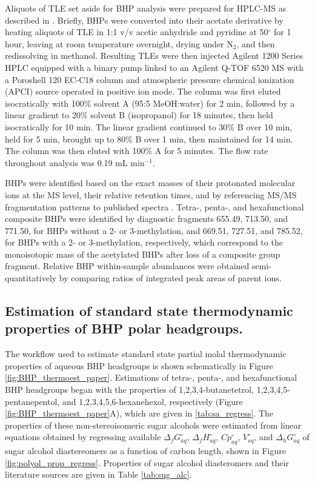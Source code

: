 Aliquots of TLE set aside for BHP analysis were prepared for HPLC-MS as described in \cite{talbot2003atmospheric}. Briefly, BHPs were converted into their acetate derivative by heating aliquots of TLE in 1:1 v/v acetic anhydride and pyridine at 50$^{\circ}$ for 1 hour, leaving at room temperature overnight, drying under N$_2$, and then redissolving in methanol. Resulting TLEs were then injected Agilent 1200 Series HPLC equipped with a binary pump linked to an Agilent Q-TOF 6520 MS with a Poroshell 120 EC-C18 column and atmospheric pressure chemical ionization (APCI) source operated in positive ion mode. The column was first eluted isocratically with 100\% solvent A (95:5 MeOH:water) for 2 min, followed by a linear gradient to 20\% solvent B (isopropanol) for 18 minutes, then held isocratically for 10 min. The linear gradient continued to 30\% B over 10 min, held for 5 min, brought up to 80\% B over 1 min, then maintained for 14 min. The column was then eluted with 100\% A for 5 minutes. The flow rate throughout analysis was 0.19 mL min$^{-1}$.

BHPs were identified based on the exact masses of their protonated molecular ions at the MS level, their relative retention times, and by referencing MS/MS fragmentation patterns to published spectra \citep{talbot2005bacteriohopanepolyols, talbot2007rapid, talbot2007structural, talbot2003atmospheric, talbot2003characteristic, talbot2008cyanobacterial}. Tetra-, penta-, and hexafunctional composite BHPs were identified by diagnostic fragments 655.49, 713.50, and 771.50, for BHPs without a 2- or 3-methylation, and 669.51, 727.51, and 785.52, for BHPs with a 2- or 3-methylation, respectively, which correspond to the monoisotopic mass of the acetylated BHPs after loss of a composite group fragment. Relative BHP within-sample abundances were obtained semi-quantitatively by comparing ratios of integrated peak areas of parent ions.

\subsection{Estimation of standard state thermodynamic properties of BHP polar headgroups.}
The workflow used to estimate standard state partial molal thermodynamic properties of aqueous BHP headgroups is shown schematically in Figure \ref{fig:BHP_thermoest_paper}. Estimations of tetra-, penta-, and hexafunctional BHP headgroups began with the properties of 1,2,3,4-butanetetrol, 1,2,3,4,5-pentanepentol, and 1,2,3,4,5,6-hexanehexol, respectively (Figure \ref{fig:BHP_thermoest_paper}A), which are given in \ref{tab:sa_regress}. The properties of these non-stereoisomeric sugar alcohols were estimated from linear equations obtained by regressing available $\Delta_{f}G^{\circ}_{aq}$, $\Delta_{f}H^{\circ}_{aq}$, $Cp^{\circ}_{aq}$, $V^{\circ}_{aq}$, and $\Delta_{h}G^{\circ}_{aq}$ of sugar alcohol diastereomers as a function of carbon length, shown in Figure \ref{fig:polyol_prop_regress}. Properties of sugar alcohol diasteromers and their literature sources are given in Table \ref{tab:sug_alc}.


